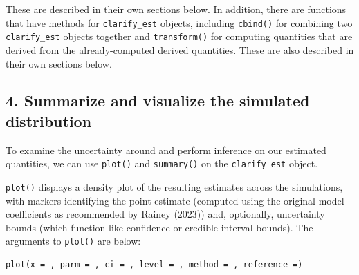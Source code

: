 These are described in their own sections below. In addition, there are functions that have methods for \texttt{clarify\_est} objects, including \texttt{cbind()} for combining two \texttt{clarify\_est} objects together and \texttt{transform()} for computing quantities that are derived from the already-computed derived quantities. These are also described in their own sections below.

\subsection{4. Summarize and visualize the simulated distribution}\label{summarize-and-visualize-the-simulated-distribution}

To examine the uncertainty around and perform inference on our estimated quantities, we can use \texttt{plot()} and \texttt{summary()} on the \texttt{clarify\_est} object.

\texttt{plot()} displays a density plot of the resulting estimates across the simulations, with markers identifying the point estimate (computed using the original model coefficients as recommended by Rainey (2023)) and, optionally, uncertainty bounds (which function like confidence or credible interval bounds). The arguments to \texttt{plot()} are below:

\begin{verbatim}
plot(x = , parm = , ci = , level = , method = , reference =)
\end{verbatim}

